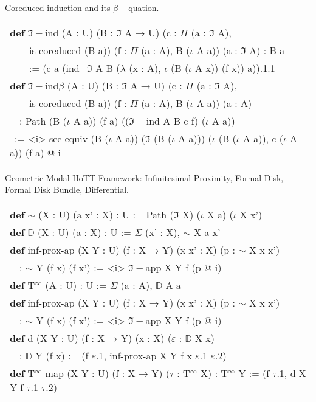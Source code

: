\documentclass[a4paper,UKenglish,cleveref, autoref, thm-restate]{lipics-v2021}
\newcommand{\tabstyle}[0]{\scriptsize\ttfamily\fontseries{l}\selectfont}
\begin{document}
Coreduced induction and its $\beta-$quation.

\begin{table}[ht]
\tabstyle
\begin{tabular}{l}
\textbf{def} $\Im-$ind (A : U) (B : $\Im$ A → U) (c : $\Pi$ (a : $\Im$ A), \\
\ \ \ \ is-coreduced (B a)) (f : $\Pi$ (a : A), B ($\iota$ A a)) (a : $\Im$ A) : B a \\
\ \ \ \ := (c a (ind$-\Im$ A B ($\lambda$ (x : A), $\iota$ (B ($\iota$ A x)) (f x)) a)).1.1 \\
\textbf{def} $\Im-$ind$\beta$ (A : U) (B : $\Im$ A → U) (c : $\Pi$ (a : $\Im$ A), \\
\ \ \ \ is-coreduced (B a)) (f : $\Pi$ (a : A), B ($\iota$ A a)) (a : A) \\
\ \ : Path (B ($\iota$ A a)) (f a) (($\Im-$ind A B c f) ($\iota$ A a)) \\
\ := <i> sec-equiv (B ($\iota$ A a)) ($\Im$ (B ($\iota$ A a))) ($\iota$ (B ($\iota$ A a)), c ($\iota$ A a)) (f a) @-i \\
\end{tabular}
\end{table}

Geometric Modal HoTT Framework: Infinitesimal Proximity, Formal Disk, Formal Disk Bundle, Differential.

\begin{table}[ht]
\tabstyle
\begin{tabular}{l}
\textbf{def} $\sim$ (X : U) (a x' : X) : U := Path ($\Im$ X) ($\iota$ X a) ($\iota$ X x') \\
\textbf{def} $\mathbb{D}$ (X : U) (a : X) : U := $\Sigma$ (x' : X), $\sim$ X a x' \\
\textbf{def} inf-prox-ap (X Y : U) (f : X → Y) (x x' : X) (p : $\sim$ X x x') \\
\ \ : $\sim$ Y (f x) (f x') := <i> $\Im-$app X Y f (p @ i) \\
\textbf{def} T$^\infty$ (A : U) : U := $\Sigma$ (a : A), $\mathbb{D}$ A a \\
\textbf{def} inf-prox-ap (X Y : U) (f : X → Y) (x x' : X) (p : $\sim$ X x x') \\
\ \ : $\sim$ Y (f x) (f x') := <i> $\Im-$app X Y f (p @ i) \\
\textbf{def} d (X Y : U) (f : X → Y) (x : X) ($\varepsilon$ : $\mathbb{D}$ X x) \\
\ \ : $\mathbb{D}$ Y (f x) := (f $\varepsilon$.1, inf-prox-ap X Y f x $\varepsilon$.1 $\varepsilon$.2) \\
\textbf{def} T$^\infty$-map (X Y : U) (f : X → Y) ($\tau$ : T$^\infty$ X) : T$^\infty$ Y := (f $\tau$.1, d X Y f $\tau$.1 $\tau$.2) \\
\end{tabular}
\end{table}
\end{document}
